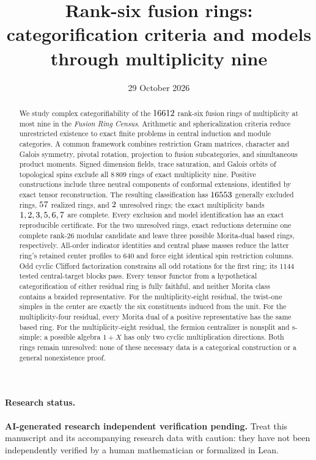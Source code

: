 \documentclass[11pt]{article}
\title{Rank-six fusion rings:\\categorification criteria and models\\through multiplicity nine}
\author{}
\date{29 October 2026}
\begin{document}
\maketitle
\begin{abstract}
We study complex categorifiability of the $16612$ rank-six fusion
rings of multiplicity at most nine in the \emph{Fusion Ring Census}.
Arithmetic and sphericalization criteria reduce unrestricted existence to
exact finite problems in central induction and module categories.
A common framework combines restriction Gram matrices, character and
Galois symmetry, pivotal rotation, projection to fusion subcategories,
and simultaneous product moments. Signed dimension fields, trace saturation,
and Galois orbits of topological spins exclude all $8\,809$ rings of exact
multiplicity nine. Positive constructions include three
neutral components of conformal extensions, identified by exact tensor
reconstruction.
The resulting classification has $16553$ generally excluded
rings, $57$ realized rings, and $2$ unresolved
rings; the exact multiplicity bands $1, 2, 3, 5, 6, 7$ are complete.
Every exclusion and model identification has an exact reproducible
certificate. For the two unresolved rings, exact reductions determine
one complete rank-26 modular candidate and leave three possible
Morita-dual based rings, respectively. All-order indicator identities and central phase masses reduce the latter
ring's retained center profiles to $640$ and force eight identical spin
restriction columns. Odd cyclic Clifford factorization constrains all odd
rotations for the first ring; its $1144$ tested central-target blocks pass. Every tensor functor from a hypothetical
categorification of either residual ring is fully faithful, and neither
Morita class contains a braided representative. For the multiplicity-eight
residual, the twist-one simples in the center are exactly the six
constituents induced from the unit. For the multiplicity-four residual, every Morita dual of a positive representative has the same based ring. For the multiplicity-eight residual, the fermion centralizer is nonsplit and s-simple; a possible algebra $1+X$ has only two cyclic multiplication directions. Both rings remain unresolved: none of these necessary data is a categorical construction or a general nonexistence proof.
\end{abstract}
\paragraph{Research status.} \textbf{AI-generated research \textperiodcentered{} independent verification pending.} Treat this manuscript and its accompanying research data with caution: they have not been independently verified by a human mathematician or formalized in Lean.
\setcounter{tocdepth}{1}{\footnotesize\tableofcontents}
\end{document}
